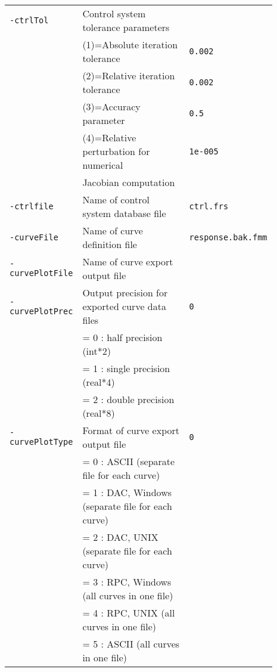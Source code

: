{\begin{tabular}{|>{\raggedright} p{0.23\linewidth}| p{0.48\linewidth}| p{0.18\linewidth}|}
  \texttt{-ctrlTol} &    Control system tolerance parameters       &            \\
                    &    (1)=Absolute iteration tolerance           &    \texttt{0.002}   \\
                    &    (2)=Relative iteration tolerance           &    \texttt{0.002}   \\
                    &    (3)=Accuracy parameter                     &    \texttt{0.5}     \\
                    &    (4)=Relative perturbation for numerical    &    \texttt{1e-005}  \\
                    &    Jacobian computation                       &            \\
  \hline
  \texttt{-ctrlfile} &   Name of control system database file    &   \texttt{ctrl.frs}  \\
  \hline
  \texttt{-curveFile} &   Name of curve definition file          &   \texttt{\scriptsize{response.bak.fmm}}  \\
  \hline
  \texttt{-curvePlotFile} &   Name of curve export output file  &   \\
  \hline
  \texttt{-curvePlotPrec} &   Output precision for exported curve data files & \texttt{0}  \\
                          &    = 0 : half precision (int*2)    &       \\
                          &    = 1 : single precision (real*4)    &              \\
                          &    = 2 : double precision (real*8)   &               \\
  \hline
  \texttt{-curvePlotType} &    Format of curve export output file    &   \texttt{0} \\
                          &    = 0 : ASCII (separate file for each curve)     &      \\
                          &    = 1 : DAC, Windows (separate file for each curve) &   \\
                          &    = 2 : DAC, UNIX (separate file for each curve)    &   \\
                          &    = 3 : RPC, Windows (all curves in one file)       &   \\
                          &    = 4 : RPC, UNIX (all curves in one file)          &    \\
                          &    = 5 : ASCII (all curves in one file)              &   \\

\end{tabular}}
